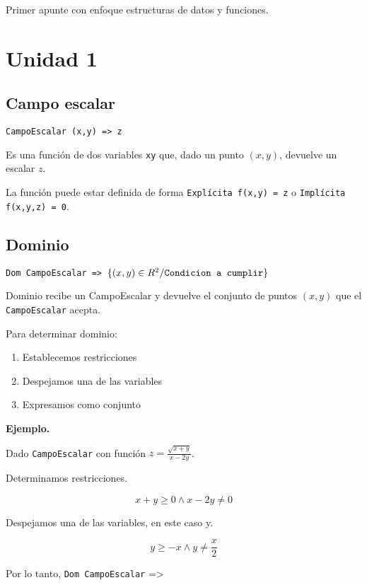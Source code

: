 Primer apunte con enfoque estructuras de datos y funciones.

\section{Unidad 1}

\subsection{Campo escalar}

\texttt{CampoEscalar (x,y) => z}

Es una función de dos variables \texttt{xy} que, 
dado un punto \((x,y)\),
devuelve un escalar \(z\).

La función puede estar definida de forma 
\texttt{Explícita f(x,y) = z} o \texttt{Implícita f(x,y,z) = 0}.

\subsection{Dominio}

\texttt{Dom CampoEscalar => \(\{(x,y) \in R^{2} / \text{\texttt{Condicion a cumplir}}\}\)}

Dominio recibe un CampoEscalar y devuelve el conjunto de puntos \((x,y)\)
que el \texttt{CampoEscalar} acepta.

Para determinar dominio:
\begin{enumerate}
    \item Establecemos restricciones
    \item Despejamos una de las variables
    \item Expresamos como conjunto
\end{enumerate}

\textbf{Ejemplo.}

Dado \texttt{CampoEscalar} con función 
\(z = \frac{\sqrt{x+y}}{x-2y}\).

Determinamos restricciones.

\begin{equation*}
    x+y \geq 0 \land x-2y \neq 0
\end{equation*}

Despejamos una de las variables, en este caso y.

\begin{equation*}
    y \geq -x \land y \neq \frac{x}{2}
\end{equation*}

Por lo tanto, \texttt{Dom CampoEscalar} =>

